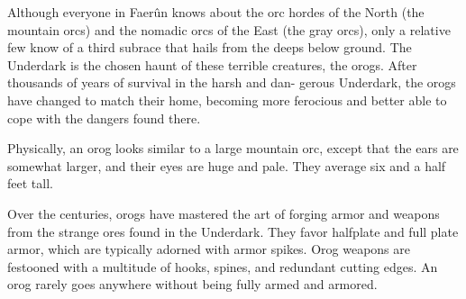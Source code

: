
Although everyone in Faerûn knows about the orc hordes of the North (the mountain orcs) and the nomadic orcs of the East (the gray orcs), only a relative few know of a third subrace that hails from the deeps below ground. The Underdark is the chosen haunt of these terrible creatures, the orogs. After thousands of years of survival in the harsh and dan- gerous Underdark, the orogs have changed to match their home, becoming more ferocious and better able to cope with the dangers found there.

Physically, an orog looks similar to a large mountain orc, except that the ears are somewhat larger, and their eyes are huge and pale. They average six and a half feet tall.

Over the centuries, orogs have mastered the art of forging armor and weapons from the strange ores found in the Underdark. They favor halfplate and full plate armor, which are typically adorned with armor spikes. Orog weapons are festooned with a multitude of hooks, spines, and redundant cutting edges. An orog rarely goes anywhere without being fully armed and armored.

